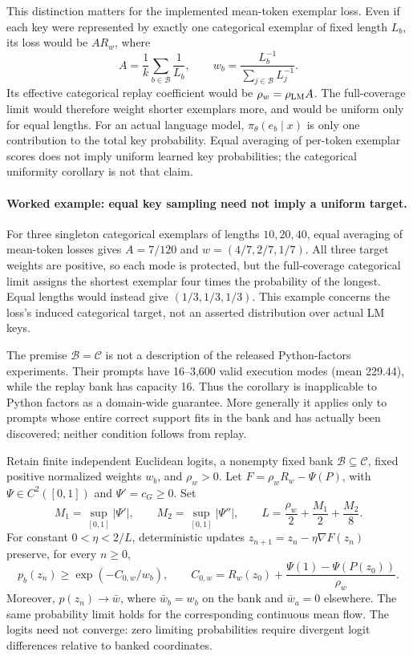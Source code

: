This distinction matters for the implemented mean-token exemplar loss.
Even if each key were represented by exactly one categorical exemplar of
fixed length $L_b$, its loss would be $A R_w$, where
\[
 A=\frac1k\sum_{b\in\mathcal B}\frac1{L_b},\qquad
 w_b=\frac{L_b^{-1}}{\sum_{j\in\mathcal B}L_j^{-1}}.
\]
Its effective categorical replay coefficient would be $\rho_w=\rho_{\rm LM}A$.
The full-coverage limit would therefore weight shorter exemplars more, and
would be uniform only for equal lengths. For an actual language model,
$\pi_\theta(e_b\mid x)$ is only one contribution to the total key probability.
Equal averaging of per-token exemplar scores does not imply uniform learned
key probabilities; the categorical uniformity corollary is not that claim.

\paragraph{Worked example: equal key sampling need not imply a uniform target.}
For three singleton categorical exemplars of lengths $10,20,40$, equal
averaging of mean-token losses gives $A=7/120$ and
$w=(4/7,2/7,1/7)$. All three target weights are positive, so each mode is
protected, but the full-coverage categorical limit assigns the shortest
exemplar four times the probability of the longest. Equal lengths would
instead give $(1/3,1/3,1/3)$. This example concerns the loss's induced
categorical target, not an asserted distribution over actual LM keys.

The premise $\mathcal B=\mathcal C$ is not a description of the released
Python-factors experiments. Their prompts have 16--3,600 valid execution modes
(mean 229.44), while the replay bank has capacity 16. Thus the corollary is
inapplicable to Python factors as a domain-wide guarantee. More generally it
applies only to prompts whose entire correct support fits in the bank and has
actually been discovered; neither condition follows from replay.

\begin{lemma}
\label{lem:replay-finite-steps}
Retain finite independent Euclidean logits, a nonempty fixed bank
$\mathcal B\subseteq\mathcal C$, fixed positive normalized weights $w_b$,
and $\rho_w>0$. Let $F=\rho_wR_w-\Psi(P)$, with
$\Psi\in C^2([0,1])$ and $\Psi'=c_G\ge0$. Set
\[
 M_1=\sup_{[0,1]}|\Psi'|,\qquad
 M_2=\sup_{[0,1]}|\Psi''|,\qquad
 L=\frac{\rho_w}{2}+\frac{M_1}{2}+\frac{M_2}{8}.
\]
For constant $0<\eta<2/L$, deterministic updates
$z_{n+1}=z_n-\eta\nabla F(z_n)$ preserve, for every $n\ge0$,
\[
 p_b(z_n)\ge \exp(-C_{0,w}/w_b),\qquad
 C_{0,w}=R_w(z_0)+\frac{\Psi(1)-\Psi(P(z_0))}{\rho_w}.
\]
Moreover, $p(z_n)\to\bar w$, where $\bar w_b=w_b$ on the bank and
$\bar w_a=0$ elsewhere. The same probability limit holds for the corresponding
continuous mean flow. The logits need not converge: zero limiting probabilities require divergent logit differences relative to banked coordinates.
\end{lemma}

